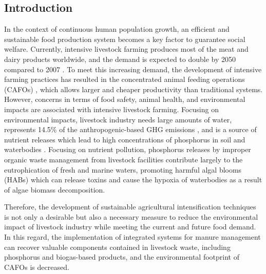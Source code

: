 \begin{refsection}[referencesCh5]
\section{Introduction}
In the context of continuous human population growth, an efficient and sustainable food production system becomes a key factor to guarantee social welfare. Currently, intensive livestock farming produces most of the meat and dairy products worldwide, and the demand is expected to double by 2050 compared to 2007 \citep{livestock_projection}. To meet this increasing demand, the development of intensive farming practices has resulted in the concentrated animal feeding operations (CAFOs) \citep{animal_unit_definition}, which allows larger and cheaper productivity than traditional systems. However, concerns in terms of food safety, animal health, and environmental impacts are associated with intensive livestock farming. Focusing on environmental impacts, livestock industry needs large amounts of water, represents 14.5\% of the anthropogenic-based GHG emissions \citep{eisler_agriculture:_2014}, and is a source of nutrient releases which lead to high concentrations of phosphorus in soil and waterbodies \citep{Sampat2017}. Focusing on nutrient pollution, phosphorus releases by improper organic waste management from livestock facilities contribute largely to the eutrophication of fresh and marine waters, promoting harmful algal blooms (HABs) which can release toxins and cause the hypoxia of waterbodies as a result of algae biomass decomposition. 

Therefore, the development of sustainable agricultural intensification techniques is not only a desirable but also a necessary measure to reduce the environmental impact of livestock industry while meeting the current and future food demand. In this regard, the implementation of integrated systems for manure management can recover valuable components contained in livestock waste, including phosphorus and biogas-based products, and the environmental footprint of CAFOs is decreased.


\end{refsection}

